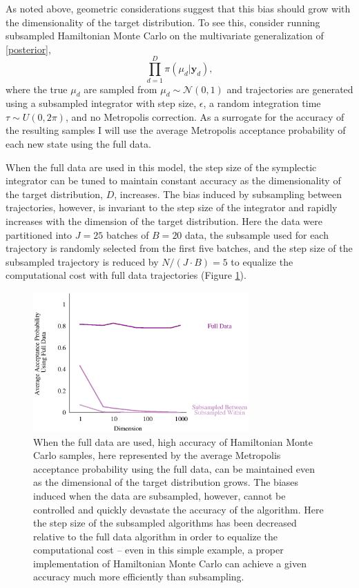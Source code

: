 \documentclass{article}
\begin{document}
As noted above, geometric considerations suggest that this bias should grow with the 
dimensionality of the target distribution.  To see this, consider running subsampled
Hamiltonian Monte Carlo on the multivariate generalization of \eqref{posterior},
%
\begin{equation} \label{multivariate_posterior}
\prod_{d = 1}^{D} \pi \! \left( \mu_{d} | \mathbf{y}_{d} \right),
\end{equation}
%
where the true $\mu_{d}$ are sampled from $\mu_{d} \sim \mathcal{N} \! \left( 0, 1 \right)$
and trajectories are generated using a subsampled integrator with step size, $\epsilon$, a 
random integration time $\tau \sim U \! \left(0, 2 \pi \right)$, and no Metropolis
correction.  As a surrogate for the accuracy of the resulting samples I will use the 
average Metropolis acceptance probability of each new state using the full data.

When the full data are used in this model, the step size of the symplectic integrator can be 
tuned to maintain constant accuracy as the dimensionality of the target distribution, $D$, increases.
The bias induced by subsampling between trajectories, however, is invariant to the
step size of the integrator and rapidly increases with the dimension of the target distribution.
Here the data were partitioned into $J = 25$ batches of $B = 20$ data, the subsample
used for each trajectory is randomly selected from the first five batches, and the step size 
of the subsampled trajectory is reduced by $N / (J \cdot B) = 5$ to equalize the computational
cost with full data trajectories (Figure \ref{fig:multivariate}).

\begin{figure}
\centering
\includegraphics[width=3.25in]{multivariate.eps}
\caption{When the full data are used, high accuracy of Hamiltonian Monte Carlo samples, 
here represented by the average Metropolis acceptance probability using the full data, can 
be maintained even as the dimensional of the target distribution grows.  The biases induced 
when the data are subsampled, however, cannot be controlled and quickly devastate the 
accuracy of the algorithm.  Here the step size of the subsampled algorithms has been decreased
relative to the full data algorithm in order to equalize the computational cost -- even in this
simple example, a proper implementation of Hamiltonian Monte Carlo can achieve a given
accuracy much more efficiently than subsampling.}
\label{fig:multivariate}
\end{figure}
\end{document}
